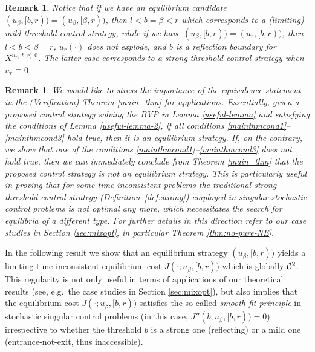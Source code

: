 \documentclass[11pt]{article} %
\newtheorem{remark}[theorem]{Remark}
\numberwithin{komcounter}{section}
\begin{document}
\begin{remark} 
Notice that if we have an equilibrium candidate $(u_\beta, [b,r))=(u_\beta, [\beta,r))$, then $l<b=\beta<r$ which corresponds to a (limiting) mild threshold control strategy, while if we have $(u_\beta, [b,r))=(u_r, [b,r))$, then $l<b<\beta=r$, $u_r(\cdot)$ does not explode, and $b$ is a reflection boundary for $X^{u_r, [b,r), 0}$. The latter case corresponds to a strong threshold control strategy when $u_r \equiv 0$.
\end{remark}

\begin{remark} 
We would like to stress the importance of the equivalence statement in the (Verification) Theorem \ref{main_thm} for applications. 
Essentially, given a proposed control strategy solving the BVP in Lemma \ref{useful-lemma} and satisfying the conditions of Lemma \ref{useful-lemma-2}, if all conditions \eqref{mainthmcond1}--\eqref{mainthmcond3} hold true, then it is an equilibrium strategy. 
If, on the contrary, we show that one of the conditions \eqref{mainthmcond1}--\eqref{mainthmcond3} does not hold true, then we can immediately conclude from Theorem \ref{main_thm} that the proposed control strategy is not an equilibrium strategy. 
This is particularly useful in proving that for some time-inconsistent problems the traditional strong threshold control strategy (Definition~\ref{def:strong}) employed in singular stochastic control problems is not optimal any more, which necessitates the search for equilibria of a different type. 
For further details in this direction refer to our case studies in Section \ref{sec:mixopt}, in particular Theorem \ref{thm:no-pure-NE}. 
\end{remark}

In the following result we show that an equilibrium strategy $(u_\beta, [b,r))$ yields a limiting time-inconsistent equilibrium cost $J(\cdot;u_\beta,[b,r))$ which is globally ${\cal C}^2$.
This regularity is not only useful in terms of applications of our theoretical results (see, e.g.~the case studies in Section \ref{sec:mixopt}), but also implies that the equilibrium cost $J(\cdot;u_\beta,[b,r))$ satisfies the so-called {\it smooth-fit principle} in stochastic singular control problems (in this case, $J''(b;u_\beta,[b,r))=0$) irrespective to whether the threshold $b$ is a strong one (reflecting) or a mild one (entrance-not-exit, thus inaccessible). 
\end{document}
